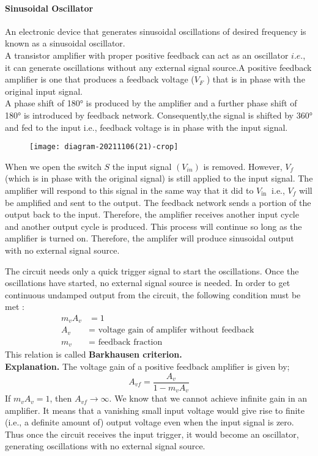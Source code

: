\paragraph{Sinusoidal Oscillator}
An electronic device that generates sinusoidal oscillations of desired frequency is known as a sinusoidal oscillator.\\
A transistor amplifier with proper positive feedback can act as an oscillator $i . e .$, it can generate oscillations without any external signal source.A positive feedback amplifier is one that produces a feedback voltage ($V_F$ ) that is in phase with the original input signal.\\
A phase shift of 180° is produced by the amplifier and a further phase shift of 180° is introduced by feedback network. Consequently,the signal is shifted by 360° and fed to the input i.e., feedback voltage is in phase with the input signal.\\
\begin{figure}[H]
	\centering
	\texttt{[image: diagram-20211106(21)-crop]}
	\caption{}
	\label{}
\end{figure}
\par  When we open the switch $S$  the input signal $\left(V_{i n}\right)$ is removed. However, $V_{f}$ (which is in phase with the original signal) is still applied to the input signal. The amplifier will respond to this signal in the same way that it did to $V_{\text {in }}$ i.e., $V_{f}$ will be amplified and sent to the output. The feedback network sends a portion of the output back to the input. Therefore, the amplifier receives another input cycle and another output cycle is produced. This process will continue so long as the amplifier is turned on. Therefore, the amplifer will produce sinusoidal output with no external signal source.
\par  The circuit needs only a quick trigger signal to start the oscillations. Once the oscillations have started, no external signal source is needed.
In order to get continuous undamped output from the circuit, the following condition must be met :
$$
\begin{aligned}
m_{v} A_{v} &=1 \\
A_{v} &=\text { voltage gain of amplifer without feedback } \\
m_{v} &=\text { feedback fraction }
\end{aligned}
$$
This relation is called \textbf{Barkhausen criterion. }\\
\textbf{Explanation.}
 The voltage gain of a positive feedback amplifier is given by;
$$
A_{v f}=\frac{A_{v}}{1-m_{v} A_{v}}
$$
If $m_{v} A_{v}=1$, then $A_{v f} \rightarrow \infty$.
We know that we cannot achieve infinite gain in an amplifier. It means that a vanishing small input voltage would give rise to finite (i.e., a definite amount of) output voltage even when the input signal is zero. Thus once the circuit receives the input trigger, it would become an oscillator, generating oscillations with no external signal source.
